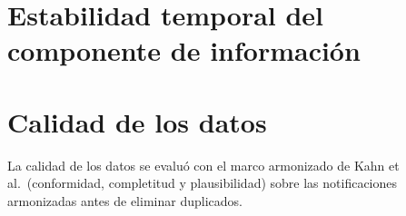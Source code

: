 \documentclass[11pt]{article}
\begin{document}
\begin{table}[htbp]
\centering\small
\caption{Diseño en lactantes: notificaciones en menores de \POInfantMonths{} meses, VA-MENGOC-BC
frente a las demás vacunas Finlay.}
\label{tab:S-disp-infant}
\POTableDispInfantFinlayComparator
\end{table}

\begin{table}[htbp]
\centering\small
\caption{Diseño de una sola vacuna: VA-MENGOC-BC administrada sola frente a otras vacunas Finlay
administradas solas.}
\label{tab:S-disp-single}
\POTableDispExcludingCoadministration
\end{table}

\begin{table}[htbp]
\centering\small
\caption{Diseño principal conservando las \PONScheduleInvalid{} dosis de VA-MENGOC-BC registradas
fuera del esquema de vacunación.}
\label{tab:S-disp-schedule}
\POTableDispPrimaryIncludingScheduleErrors
\end{table}

\begin{table}[htbp]
\centering\small
\caption{Vacunas concomitantes: notificaciones con VA-MENGOC-BC y vacunas coadministradas frente a
VA-MENGOC-BC administrada sola.}
\label{tab:S-disp-concomitant}
\POTableDispConcomitantInfluence
\end{table}

\section{Estabilidad temporal del componente de información}\label{sec:S-cumic}
\begin{table}[htbp]
\centering\small
\caption{Componente de información (IC) acumulado con intervalo de credibilidad del 95\,\%,
recalculado con las notificaciones acumuladas hasta el final de cada año, para los cuatro eventos
más notificados y para cada evento que cumple el criterio principal de señal.}
\label{tab:S-cumic}
\POTableCumulativeIC
\end{table}

\section{Calidad de los datos}\label{sec:S-dq}
La calidad de los datos se evaluó con el marco armonizado de Kahn et al.\ (conformidad, completitud
y plausibilidad) sobre las notificaciones armonizadas antes de eliminar duplicados.
\end{document}
